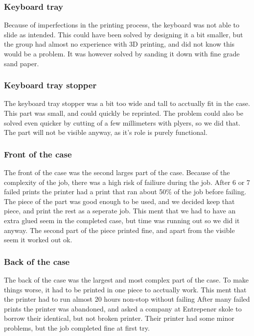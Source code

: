 \subsubsection*{Keyboard tray}
Because of imperfections in the printing process, the keyboard was not able to slide as intended.
This could have been solved by designing it a bit smaller, but the group had almost no experience with 3D printing, and did not know this would be a problem.
It was however solved by sanding it down with fine grade sand paper.

\subsubsection*{Keyboard tray stopper}
The keyboard tray stopper was a bit too wide and tall to acctually fit in the case.
This part was small, and could quickly be reprinted.
The problem could also be solved even quicker by cutting of a few millimeters with plyers, so we did that.
The part will not be visible anyway, as it's role is purely functional.

\subsubsection*{Front of the case}
The front of the case was the second larges part of the case.
Because of the complexity of the job, there was a high risk of failiure during the job.
After 6 or 7 failed prints the printer had a print that ran about 50\% of the job before failing.
The piece of the part was good enough to be used, and we decided keep that piece, and print the rest as a seperate job.
This ment that we had to have an extra glued seem in the completed case, but time was running out so we did it anyway.
The second part of the piece printed fine, and apart from the visible seem it worked out ok.

\subsubsection*{Back of the case}
The back of the case was the largest and most complex part of the case.
To make things worse, it had to be printed in one piece to acctually work.
This ment that the printer had to run almost 20 hours non-stop without failing
After many failed prints the printer was abandoned, and asked a company at Entrepenør skole to borrow their identical, but not broken printer.
Their printer had some minor problems, but the job completed fine at first try.

